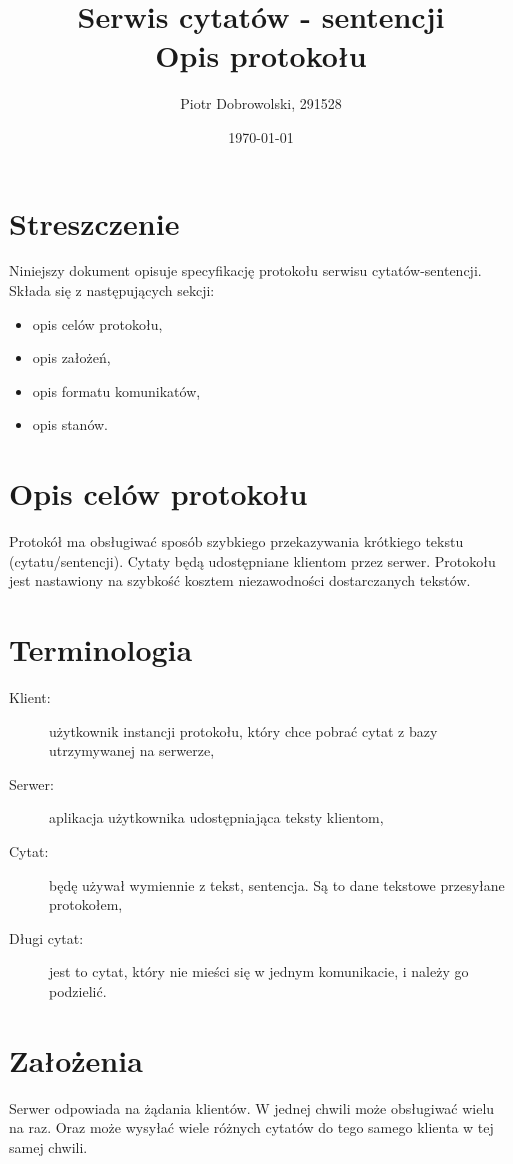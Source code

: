 \documentclass{article}
\author{Piotr Dobrowolski, 291528}
\title{Serwis cytatów - sentencji \\ Opis protokołu}
\date{\today}
\begin{document}
\maketitle
\tableofcontents
\clearpage

\section{Streszczenie}
Niniejszy dokument opisuje specyfikację protokołu serwisu cytatów-sentencji.
Składa się z następujących sekcji:
\begin{itemize}
\item opis celów protokołu,
\item opis założeń,
\item opis formatu komunikatów,
\item opis stanów.
\end{itemize}


\section{Opis celów protokołu}
Protokół ma obsługiwać sposób szybkiego przekazywania krótkiego tekstu (cytatu/sentencji).
Cytaty będą udostępniane klientom przez serwer.
Protokołu jest nastawiony na szybkość kosztem niezawodności dostarczanych tekstów.


\section{Terminologia}
\begin{description}
\item[Klient: ] użytkownik instancji protokołu, który chce pobrać cytat z bazy utrzymywanej na serwerze,
\item[Serwer: ] aplikacja użytkownika udostępniająca teksty klientom,
\item[Cytat: ] będę używał wymiennie z tekst, sentencja. Są to dane tekstowe przesyłane protokołem,
\item[Długi cytat: ] jest to cytat, który nie mieści się w jednym komunikacie, i należy go podzielić.
\end{description}


\section{Założenia}
Serwer odpowiada na żądania klientów. W jednej chwili może obsługiwać wielu na raz.
Oraz może wysyłać wiele różnych cytatów do tego samego klienta w tej samej chwili.
\end{document}
